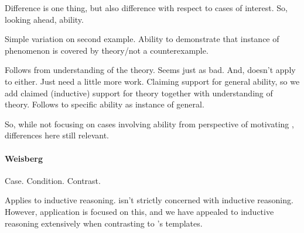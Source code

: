 \begin{note}
  \color{later}
  Difference is one thing, but also difference with respect to cases of interest.
  So, looking ahead, ability.

  Simple variation on second example.
  Ability to demonstrate that instance of phenomenon is covered by theory/not a counterexample.

  Follows from understanding of the theory.
  Seems just as bad.
  And, \citeauthor{Wright:2011wn} doesn't apply to either.
  Just need a little more work.
  Claiming support for general ability, so we add claimed (inductive) support for theory together with understanding of theory.
  Follows to specific ability as instance of general.

  So, while not focusing on cases involving ability from perspective of motivating \nI{}, differences here still relevant.
\end{note}

\paragraph{Weisberg}

\begin{note}
  Case.
  Condition.
  Contrast.

  Applies to inductive reasoning.
  \nI{} isn't strictly concerned with inductive reasoning.
  However, application is focused on this, and we have appealed to inductive reasoning extensively when contrasting \nI{} to \citeauthor{Wright:2011wn}'s templates.
\end{note}

